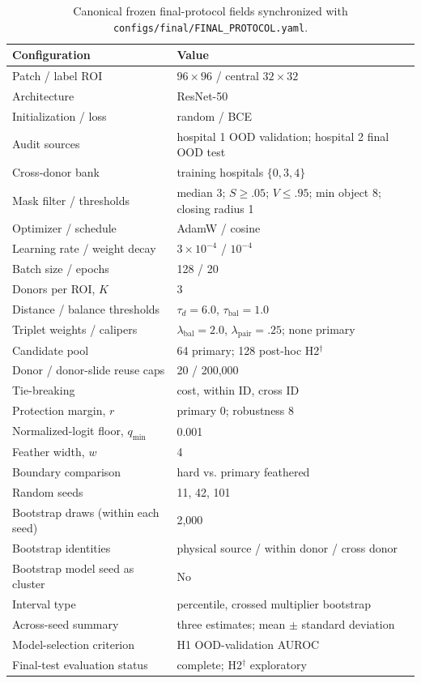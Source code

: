 \documentclass[notspecified,article,submit,moreauthors]{Definitions/mdpi}
\begin{document}
\begin{table}[H]
\caption{Canonical frozen final-protocol fields synchronized with
\texttt{configs/final/FINAL\_PROTOCOL.yaml}.}
\label{tab:full_implementation}
\centering
\scriptsize
\setlength{\tabcolsep}{2.5pt}
\begin{tabularx}{\columnwidth}{@{}>{\raggedright\arraybackslash}Xl@{}}
\toprule
Configuration & Value \\
\midrule
Patch / label ROI & $96\times96$ / central $32\times32$ \\
Architecture & ResNet-50 \\
Initialization / loss & random / BCE \\
Audit sources & hospital 1 OOD validation; hospital 2 final OOD test \\
Cross-donor bank & training hospitals $\{0,3,4\}$ \\
Mask filter / thresholds & median 3; $S\geq.05$; $V\leq.95$; min object 8; closing radius 1 \\
Optimizer / schedule & AdamW / cosine \\
Learning rate / weight decay & $3\times10^{-4}$ / $10^{-4}$ \\
Batch size / epochs & 128 / 20 \\
Donors per ROI, $K$ & 3 \\
Distance / balance thresholds & $\tau_d=6.0$, $\tau_{\mathrm{bal}}=1.0$ \\
Triplet weights / calipers & $\lambda_{\mathrm{bal}}=2.0$, $\lambda_{\mathrm{pair}}=.25$; none primary \\
Candidate pool & 64 primary; 128 post-hoc H2$^\dagger$ \\
Donor / donor-slide reuse caps & 20 / 200,000 \\
Tie-breaking & cost, within ID, cross ID \\
Protection margin, $r$ & primary 0; robustness 8 \\
Normalized-logit floor, $q_{\min}$ & 0.001 \\
Feather width, $w$ & 4 \\
Boundary comparison & hard vs. primary feathered \\
Random seeds & 11, 42, 101 \\
Bootstrap draws (within each seed) & 2,000 \\
Bootstrap identities & physical source / within donor / cross donor \\
Bootstrap model seed as cluster & No \\
Interval type & percentile, crossed multiplier bootstrap \\
Across-seed summary & three estimates; mean $\pm$ standard deviation \\
Model-selection criterion & H1 OOD-validation AUROC \\
Final-test evaluation status & complete; H2$^\dagger$ exploratory \\
\bottomrule
\end{tabularx}
\end{table}
\end{document}
